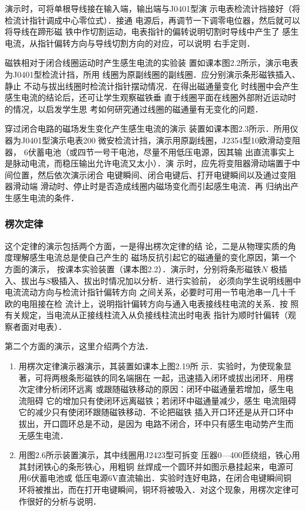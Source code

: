 演示时，可将单根导线接在输入端，输出端与J0401型演
示电表检流计挡接好（将检流计指针调成中心零位式）．接通
电源后，再调节一下调零电位器，然后就可以将导线在蹄形磁
铁中作切割运动，电表指针的偏转说明切割时导线中产生了
感生电流，从指针偏转方向与导线切割方向的对应，可以说明
右手定则．

磁铁相对于闭合线圈运动时产生感生电流的实验装
置如课本图2.2所示，演示电表为J0401型检流计挡，所用
线圈为原副线圈的副线圈．应分别演示条形磁铁插入、静止
不动与拔出线圈时检流计指针摆动情况．在得出磁通量变化
时线圈中会产生感生电流的结论后，还可让学生观察磁铁垂
直于线圈平面在线圈外部附近运动时的情况，以启发学生思
考如何研究通过线圈的磁通量有无变化的问题．

穿过闭合电路的磁场发生变化产生感生电流的演示
装置如课本图2.3所示．所用仪器为J0401型演示电表200
微安检流计挡，演示用原副线圈，J2354型10欧滑动变阻器，
6伏蓄电池（或四节一号干电池，尽量不用低压电源，因其输
出直流事实上是脉动电流，而稳压输出允许电流又太小）．演
示时，应先将变阻器滑动端置于中间位置，然后依次演示闭合
电键瞬间、闭合电键后、打开电键瞬间以及通过变阻器滑动端
滑动时、停止时是否造成线圈内磁场变化而引起感生电流．再
归纳出产生感生电流的条件．

\subsubsection{楞次定律}
这个定律的演示包括两个方面，一是得出楞次定律的结
论，二是从物理实质的角度理解感生电流总是使自己产生的
磁场反抗引起它的磁通量的变化原因，第一个方面的演示，
按课本实验装置（课本图2.2）．演示时，分别将条形磁铁$N$
极插入、拔出与$S$极插入、拔出时情况加以分析．进行实验前，
必须向学生说明线圈中电流流动方向与检流计指针偏转方向
之间关系，必要时可用一节电池串一几十千欧的电阻接在检
流计上，说明指针偏转方向与通入电表接线柱电流的关系．按
照有关规定，当电流从正接线柱流入从负接线柱流出时电表
指针为顺时针偏转（观察者面对电表）．

第二个方面的演示，这里介绍两个方法．
\begin{enumerate}
\item 用楞次定律演示器演示，其装置如课本上图2.19所
示．实验时，为使现象显著，可将两根条形磁铁的同名端捆在
一起，迅速插入闭环或拔出闭环．用楞次定律分析闭环远离
或跟随磁铁移动的原因：闭环中磁通量若增加，感生电流阻碍
它的增加只有使闭环远离磁铁；若闭环中磁通量减少，感生
电流阻碍它的减少只有使闭环跟随磁铁移动．不论把磁铁
插入开口环还是从开口环中拔出，开口圆环总是不动，是因为
电路不闭合，环中只有感生电动势产生而无感生电流．
\item 用图2.6所示装置演示，其中线圈用J2423型可拆变
压器0—400匝绕组，铁心用其封闭铁心的条形铁心，用粗铜
丝焊成一个圆环并如图示悬挂起来，电源可用6伏蓄电池或
低压电源6V直流输出．实验时连好电路，在闭合电键瞬间铜
环将被推出，而在打开电键瞬间，铜环将被吸入．对这个现象，用楞次定律可作很好的分析与说明．
\end{enumerate}

